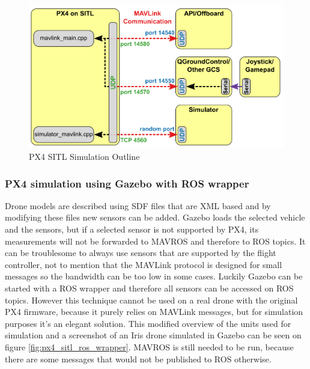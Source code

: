 \begin{figure}[h]
    \centering
    \includegraphics[width=120mm, keepaspectratio]{figures/px4_sitl_overview.png}
    \caption{PX4 SITL Simulation Outline \cite{PX4Simulation}}
    \label{fig:px4_sitl_simulation}
\end{figure}

\subsubsection{PX4 simulation using Gazebo with ROS wrapper}

Drone models are described using SDF files that are XML based and by modifying these files new sensors can 
be added. Gazebo loads the selected vehicle and the sensors, but if a selected sensor is not supported by
PX4, its measurements will not be forwarded to MAVROS and therefore to ROS topics. It can be troublesome 
to always use sensors that are supported by the flight controller, not to mention that the MAVLink protocol 
is designed for small messages so the bandwidth can be too low in some cases. Luckily Gazebo can 
be started with a ROS wrapper and therefore all sensors can be accessed on ROS topics. However this technique
cannot be used on a real drone with the original PX4 firmware, because it purely relies on MAVLink messages, 
but for simulation purposes it's an elegant solution. This modified overview of the units used for simulation
and a screenshot of an Iris drone simulated in Gazebo can be seen on figure \ref{fig:px4_sitl_ros_wrapper}. 
MAVROS is still needed to be run, because there are some messages that would not be published to ROS otherwise.

